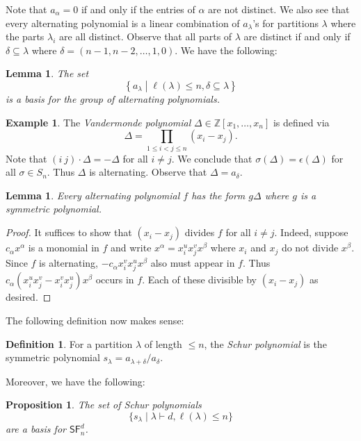 \documentclass[12pt]{article}
\theoremstyle{plain}
\newtheorem{lemma}[theorem]{Lemma}
\newtheorem{proposition}[theorem]{Proposition}
\theoremstyle{definition}
\newtheorem{definition}[theorem]{Definition}
\newtheorem{example}[theorem]{Example}
\theoremstyle{remark}
\numberwithin{equation}{section}
\begin{document}
Note that $a_\alpha=0$ if and only if the entries of $\alpha$ are
not distinct.  We also see that every alternating polynomial is a linear
combination of $a_\lambda$'s for partitions $\lambda$ where the parts
$\lambda_i$ are all distinct.
Observe that all parts of $\lambda$ are distinct if and only if
$\delta \subseteq \lambda$ where
$\delta=(n-1,n-2,\ldots,1,0)$.
We have the following:

\begin{lemma}
The set
\[
\left\{ a_\lambda \middle| \ell(\lambda) \le n, \delta \subseteq \lambda
\right\}
\]
is a basis for the group of alternating polynomials.
\end{lemma}

\begin{example}
The \emph{Vandermonde polynomial} $\Delta \in \mathbb{Z}[x_1,\ldots,x_n]$
is defined via
\[
\Delta = \prod_{1 \le i < j \le n} (x_i-x_j).
\]
Note that $(i\ j) \cdot \Delta = -\Delta$ for all $i \ne j$.
We conclude that $\sigma(\Delta) = \epsilon(\Delta)$
for all $\sigma \in S_n$.
Thus $\Delta$ is alternating.
Observe that $\Delta=a_\delta$.
\end{example}

\begin{lemma}
Every alternating polynomial $f$ has the form $g \Delta$
where $g$ is a symmetric polynomial. 
\end{lemma}

\begin{proof}
It suffices to show that $(x_i-x_j)$ divides $f$ for all $i \ne j$.
Indeed, suppose $c_\alpha x^\alpha$ is a monomial in $f$
and write $x^\alpha = x_i^u x_j^v x^\beta$ where $x_i$ and $x_j$
do not divide $x^\beta$.
Since $f$ is alternating, $-c_\alpha x_i^v x_j^u x^\beta$
also must appear in $f$.
Thus $c_\alpha (x_i^u x_j^v - x_i^v x_j^u) x^\beta$ occurs in $f$.
Each of these divisible by $(x_i-x_j)$ as desired.
\end{proof}

The following definition now makes sense:

\begin{definition}
For a partition $\lambda$ of length $\le n$, the \emph{Schur polynomial}
is the symmetric polynomial
$s_\lambda = a_{\lambda+\delta}/a_\delta$.
\end{definition}

Moreover, we have the following:

\begin{proposition}
The set of Schur polynomials
\[
\{ s_\lambda \mid \lambda \vdash d, \ell(\lambda) \le n \}
\]
are a basis for $\mathsf{SF}^d_n$.
\end{proposition}
\end{document}
